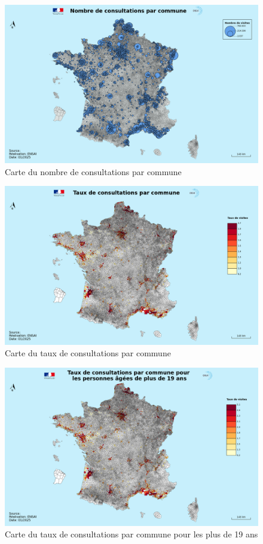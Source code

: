 \documentclass[
]{article}
\begin{document}
\begin{figure}
    \centering
    \includegraphics[width=1\linewidth]{../cartes/nombre_de_consulatations}
    \caption{Carte du nombre de consultations par commune}
    \label{fig:figure}
\end{figure}
\begin{figure}
    \centering
    \includegraphics[width=1\linewidth]{../cartes/taux_de_consultations}
    \caption{Carte du taux de consultations par commune}
    \label{fig:figure}
\end{figure}
\begin{figure}
    \centering
    \includegraphics[width=1\linewidth]{../cartes/taux_de_consultations_plus_19_ans}
    \caption{Carte du taux de consultations par commune pour les plus de 19 ans}
    \label{fig:figure}
\end{figure}
\end{document}
